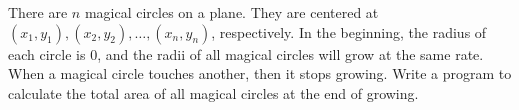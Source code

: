 There are $n$ magical circles on a plane. 
They are centered at $(x_1,y_1), (x_2,y_2), \dots, (x_n, y_n)$, respectively.
In the beginning, the radius of each circle is $0$, 
and the radii of all magical circles will grow at the same rate.
When a magical circle touches another, then it stops growing. 
Write a program to calculate the total area of all magical 
circles at the end of growing.
